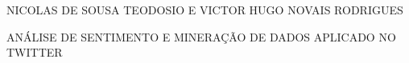%



\cleardoublepage
\thispagestyle{empty}

\vspace{-60mm}

\begin{center}
   {\large NICOLAS DE SOUSA TEODOSIO E VICTOR HUGO NOVAIS RODRIGUES}\\
   \vspace{7mm}

  ANÁLISE DE SENTIMENTO E MINERAÇÃO DE DADOS APLICADO NO TWITTER\\
 \vspace{8mm}  %
\end{center}

